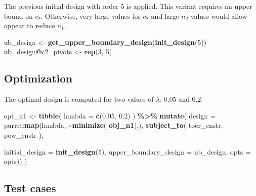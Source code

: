 \documentclass[
]{book}
\newenvironment{Shaded}{\begin{snugshade}}{\end{snugshade}}
\newcommand{\DataTypeTok}[1]{\textcolor[rgb]{0.13,0.29,0.53}{#1}}
\newcommand{\DecValTok}[1]{\textcolor[rgb]{0.00,0.00,0.81}{#1}}
\newcommand{\FloatTok}[1]{\textcolor[rgb]{0.00,0.00,0.81}{#1}}
\newcommand{\KeywordTok}[1]{\textcolor[rgb]{0.13,0.29,0.53}{\textbf{#1}}}
\newcommand{\NormalTok}[1]{#1}
\newcommand{\OperatorTok}[1]{\textcolor[rgb]{0.81,0.36,0.00}{\textbf{#1}}}
\newcommand{\StringTok}[1]{\textcolor[rgb]{0.31,0.60,0.02}{#1}}
\begin{document}
The previous initial design with order \(5\) is applied.
This variant requires an upper bound on \(c_2\).
Otherwise, very large values for \(c_2\) and large \(n_2\)-values would allow
appear to reduce \(n_1\).

\begin{Shaded}
\begin{Highlighting}[]
\NormalTok{ub\_design \textless{}{-}}\StringTok{ }\KeywordTok{get\_upper\_boundary\_design}\NormalTok{(}\KeywordTok{init\_design}\NormalTok{(}\DecValTok{5}\NormalTok{))}
\NormalTok{ub\_design}\OperatorTok{@}\NormalTok{c2\_pivots \textless{}{-}}\StringTok{ }\KeywordTok{rep}\NormalTok{(}\DecValTok{3}\NormalTok{, }\DecValTok{5}\NormalTok{)}
\end{Highlighting}
\end{Shaded}

\hypertarget{optimization-11}{%
\subsection{Optimization}\label{optimization-11}}

The optimal design is computed for two values of \(\lambda\): 0.05 and 0.2.

\begin{Shaded}
\begin{Highlighting}[]
\NormalTok{opt\_n1 \textless{}{-}}\StringTok{ }\KeywordTok{tibble}\NormalTok{(}
  \DataTypeTok{lambda =} \KeywordTok{c}\NormalTok{(}\FloatTok{0.05}\NormalTok{, }\FloatTok{0.2}\NormalTok{)}
\NormalTok{) }\OperatorTok{\%\textgreater{}\%}
\StringTok{  }\KeywordTok{mutate}\NormalTok{(}
    \DataTypeTok{design =}\NormalTok{ purrr}\OperatorTok{::}\KeywordTok{map}\NormalTok{(lambda, }\OperatorTok{\textasciitilde{}}\KeywordTok{minimize}\NormalTok{(}
          \KeywordTok{obj\_n1}\NormalTok{(.),}
          \KeywordTok{subject\_to}\NormalTok{(}
\NormalTok{              toer\_cnstr,}
\NormalTok{              pow\_cnstr}
\NormalTok{          ),}
          
          \DataTypeTok{initial\_design        =} \KeywordTok{init\_design}\NormalTok{(}\DecValTok{5}\NormalTok{), }
          \DataTypeTok{upper\_boundary\_design =}\NormalTok{ ub\_design,}
          \DataTypeTok{opts                  =}\NormalTok{ opts)) }
\NormalTok{)}
\end{Highlighting}
\end{Shaded}

\hypertarget{test-cases-12}{%
\subsection{Test cases}\label{test-cases-12}}
\end{document}
